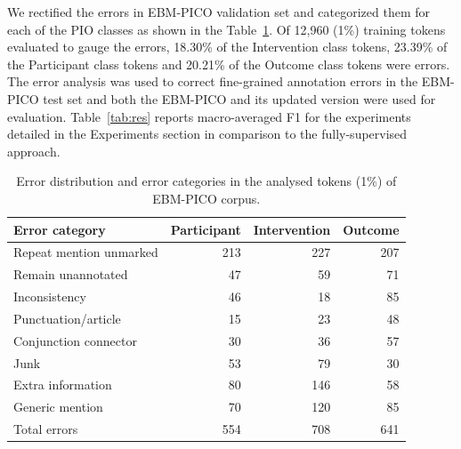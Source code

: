 \documentclass[10.7pt,]{article}
\begin{document}
%
%
%
We rectified the errors in EBM-PICO validation set and categorized them for each of the PIO classes as shown in the Table~\ref{tab:errordist}.
Of 12,960 (1\%) training tokens evaluated to gauge the errors, 18.30\% of the Intervention class tokens, 23.39\% of the Participant class tokens and 20.21\% of the Outcome class tokens were errors.
The error analysis was used to correct fine-grained annotation errors in the EBM-PICO test set and both the EBM-PICO and its updated version were used for evaluation.
Table~\ref{tab:res} reports macro-averaged F1 for the experiments detailed in the Experiments section in comparison to the fully-supervised approach.
%
\begin{table}[!ht]
    \centering
    \begin{tabular}{|l|r|r|r|}
    \hline
        Error category & Participant & Intervention & Outcome \\ \hline
        Repeat mention unmarked & 213 & 227 & 207 \\ 
        Remain unannotated & 47 & 59 & 71 \\ 
        Inconsistency & 46 & 18 & 85 \\ 
        Punctuation/article & 15 & 23 & 48 \\ 
        Conjunction connector & 30 & 36 & 57 \\ 
        Junk & 53 & 79 & 30 \\ 
        Extra information & 80 & 146 & 58 \\ 
        Generic mention & 70 & 120 & 85 \\ \hline
        Total errors & 554 & 708 & 641 \\ \hline
    \end{tabular}
    \caption{\label{tab:errordist} Error distribution and error categories in the analysed tokens (1\%) of EBM-PICO corpus.}
\end{table}
%
%
%
\end{document}

